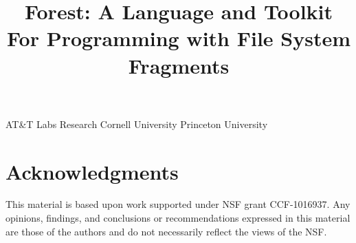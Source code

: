\documentclass[nocopyrightspace,natbib]{sigplanconf}
\begin{document}
\copyrightdata{} 

\title{Forest: A Language and Toolkit For Programming with File System Fragments}

	   {AT\&T Labs Research}
           {}
           {Cornell University}
           {}
           {Princeton University}
           {}



\maketitle{}

\begin{abstract}  

\end{abstract}















\section*{Acknowledgments}

This material is based upon work 
supported under NSF grant CCF-1016937.
Any opinions, findings, and conclusions or recommendations
   expressed in this material are those of the authors and do not
   necessarily reflect the views of the NSF.


%



%
\end{document}
